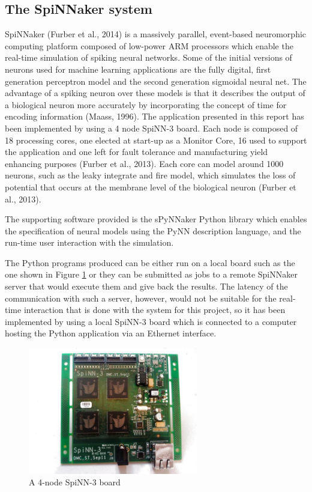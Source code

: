 \documentclass[10pt]{article}
\begin{document}
    \subsection{The SpiNNaker system}

    SpiNNaker (Furber et al., 2014) is a massively parallel, event-based neuromorphic computing platform composed of low-power ARM processors which enable the real-time simulation of spiking neural networks. Some of the initial versions of neurons used for machine learning applications are the fully digital, first generation perceptron model and the second generation sigmoidal neural net. The advantage of a spiking neuron over these models is that it describes the output of a biological neuron more accurately by incorporating the concept of time for encoding information (Maass, 1996). The application presented in this report has been implemented by using a 4 node SpiNN-3 board. Each node is composed of 18 processing cores, one elected at start-up as a Monitor Core, 16 used to support the application and one left for fault tolerance and manufacturing yield enhancing purposes (Furber et al., 2013). Each core can model around 1000 neurons, such as the leaky integrate and fire model, which simulates the loss of potential that occurs at the membrane level of the biological neuron (Furber et al., 2013).

    The supporting software provided is the sPyNNaker Python library which enables the specification of neural models using the PyNN description language, and the run-time user interaction with the simulation.

    The Python programs produced can be either run on a local board such as the one shown in Figure \ref{fig:spinnBoard} or they can be submitted as jobs to a remote SpiNNaker server that would execute them and give back the results. The latency of the communication with such a server, however, would not be suitable for the real-time interaction that is done with the system for this project, so it has been implemented by using a local SpiNN-3 board which is connected to a computer hosting the Python application via an Ethernet interface.

    \begin{figure}[ht!]
    \centering
    \includegraphics[width=74mm]{./SpiNN-3.jpg}
    \caption{A 4-node SpiNN-3 board \label{overflow}}
    \label{fig:spinnBoard}
    \end{figure}
\end{document}
